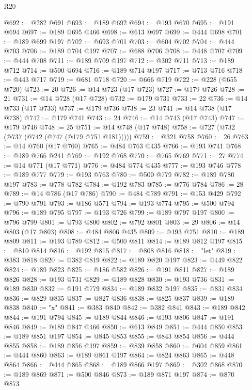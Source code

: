 \begin{lexlean}{R20}
\begin{coremodule}
@692 := @282 @691
@693 := @189 @692
@694 := @193 @670
@695 := @191 @694
@697 := @189 @695 @466
@698 := @613 @697
@699 := @444 @698
@701 := @189 @699 @197
@702 := @693 @701
@703 := @604 @702
@704 := @444 @703
@706 := @189 @704 @197
@707 := @688 @706
@708 := @448 @707
@709 := @444 @708
@711 := @189 @709 @197
@712 := @302 @711
@713 := @189 @712
@714 := @500 @694
@716 := @189 @714 @197
@717 := @713 @716
@718 := @443 @717
@719 := @681 @718
@720 := @666 @719
@722 := @228 (@655 @720)
@723 := 20
@726 := @14 @723 (@17 @723)
@727 := @179 @726
@728 := 21
@731 := @14 @728 (@17 @728)
@732 := @179 @731
@733 := 22
@736 := @14 @733 (@17 @733)
@737 := @179 @736
@738 := 23
@741 := @14 @738 (@17 @738)
@742 := @179 @741
@743 := 24
@746 := @14 @743 (@17 @743)
@747 := @179 @746
@748 := 25
@751 := @14 @748 (@17 @748)
@758 := @727 (@732 (@737 (@742 (@747 (@179 @751 @181)))))
@759 := @321 @758
@760 := 26
@763 := @14 @760 (@17 @760)
@765 := @484 @763 @435
@766 := @193 @741
@768 := @189 @766 @241
@769 := @192 @768
@770 := @765 @769
@771 := 27
@774 := @14 @771 (@17 @771)
@776 := @484 @774 @435
@777 := @193 @746
@778 := @189 @777
@779 := @193 @763
@780 := @500 @779
@782 := @189 @780 @197
@783 := @778 @782
@784 := @192 @783
@785 := @776 @784
@786 := 28
@789 := @14 @786 (@17 @786)
@790 := @484 @789
@791 := @153 @429
@792 := @790 @791
@793 := @186 @571
@794 := @193 @774
@795 := @500 @794
@796 := @189 @795
@797 := @193 @726
@799 := @189 @797 @197
@800 := @796 @799
@801 := @793 @800
@802 := @792 @801
@803 := 29
@806 := @14 @803 (@17 @803)
@808 := @484 @806 @435
@809 := @193 @751
@810 := @189 @809
@811 := @193 @789
@812 := @500 @811
@814 := @189 @812 @197
@815 := @810 @814
@816 := @192 @815
@817 := @808 @816
@818 := "let"
@819 := @383 @818
@820 := @382 @819
@822 := @189 @820 @197
@823 := @449 @822
@824 := @189 @823
@825 := @186 @582
@826 := @191 @811
@827 := @189 @826
@828 := @193 @731
@829 := @189 @828
@830 := @193 @736
@831 := @189 @830
@832 := @191 @779
@834 := @189 @832 @197
@835 := @831 @834
@836 := @829 @835
@837 := @827 @836
@838 := @825 @837
@839 := @189 @838
@840 := "x"
@841 := @383 @840
@842 := @382 @841
@843 := @189 @842
@844 := @191 @794
@845 := @189 @844
@846 := @193 @806
@847 := @191 @846
@849 := @189 @847 @466
@850 := @613 @849
@851 := @444 @850
@853 := @189 @851 @197
@854 := @845 @853
@855 := @843 @854
@856 := @444 @855
@858 := @189 @856 @197
@859 := @839 @858
@860 := @604 @859
@861 := @444 @860
@863 := @189 @861 @197
@864 := @824 @863
@865 := @448 @864
@866 := @444 @865
@868 := @189 @866 @197
@869 := @302 @868
@870 := @189 @869
@871 := @500 @846
@873 := @189 @871 @197
@874 := @870 @873

\end{coremodule}
\end{lexlean}
